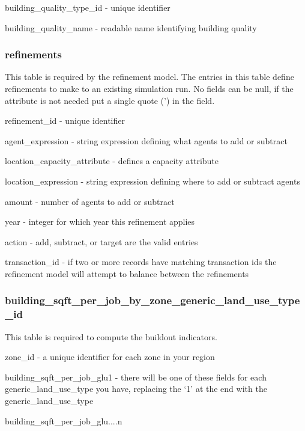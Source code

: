 \begin{description}
\item building\_quality\_type\_id - unique identifier
\item building\_quality\_name - readable name identifying building quality 
\end{description}

\subsubsection{refinements} 
\label{sec:refinements}

This table is required by the refinement model. The entries in this table define refinements to make to an existing simulation run. No fields can be null, if the attribute is not needed put a single quote (') in the field.

\begin{description}
\item refinement\_id - unique identifier
\item agent\_expression - string expression defining what agents to add or subtract
\item location\_capacity\_attribute - defines a capacity attribute
\item location\_expression - string expression defining where to add or subtract agents
\item amount - number of agents to add or subtract
\item year - integer for which year this refinement applies
\item action - add, subtract, or target are the valid entries
\item transaction\_id - if two or more records have matching transaction ids the refinement model will attempt to balance between the refinements 
\end{description}

\subsubsection{building\_sqft\_per\_job\_by\_zone\_generic\_land\_use\_type\_id}

This table is required to compute the buildout indicators.

\begin{description}
\item zone\_id - a unique identifier for each zone in your region
\item building\_sqft\_per\_job\_glu1 - there will be one of these fields for each generic\_land\_use\_type you have, replacing the `1' at the end with the generic\_land\_use\_type
\item building\_sqft\_per\_job\_glu....n 
\end{description}

